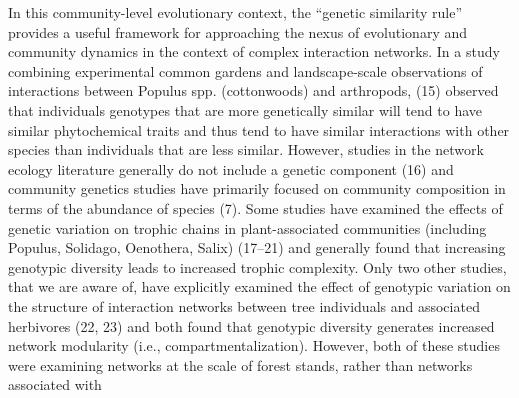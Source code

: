 \documentclass{article}
\begin{document}
In this community-level evolutionary context, the ``genetic similarity
rule'' provides a useful framework for approaching the nexus of
evolutionary and community dynamics in the context of complex
interaction networks. In a study combining experimental common gardens
and landscape-scale observations of interactions between Populus spp.
(cottonwoods) and arthropods, (15) observed that individuals genotypes
that are more genetically similar will tend to have similar
phytochemical traits and thus tend to have similar interactions with
other species than individuals that are less similar. However, studies
in the network ecology literature generally do not include a genetic
component (16) and community genetics studies have primarily focused
on community composition in terms of the abundance of species
(7). Some studies have examined the effects of genetic variation on
trophic chains in plant-associated communities (including Populus,
Solidago, Oenothera, Salix) (17--21) and generally found that
increasing genotypic diversity leads to increased trophic
complexity. Only two other studies, that we are aware of, have
explicitly examined the effect of genotypic variation on the structure
of interaction networks between tree individuals and associated
herbivores (22, 23) and both found that genotypic diversity generates
increased network modularity (i.e., compartmentalization).  However,
both of these studies were examining networks at the scale of forest
stands, rather than networks associated with %
%
%
%
\end{document}
